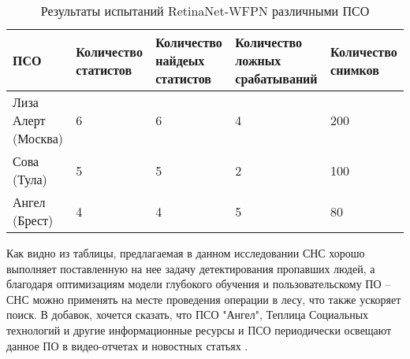 \begin{table}[H]
    \caption{Результаты испытаний RetinaNet-WFPN различными ПСО}\label{usage-results}
    \begin{tabular}{|p{2.8cm}|p{3cm}|p{3cm}|p{3cm}|p{3cm}|}
        \hline
        {ПСО} & {Количество статистов} & {Количество найдеых статистов} & {Количество ложных срабатываний} & {Количество снимков} \\
        \hline
        Лиза Алерт (Москва) & 6 & 6 & 4 & 200 \\
        \hline
        Сова (Тула) & 5 & 5 & 2 & 100 \\
        \hline
        Ангел (Брест) & 4 & 4 & 5 & 80 \\
        \hline
    \end{tabular}
\end{table}

Как видно из таблицы, предлагаемая в данном исследовании СНС хорошо выполняет поставленную на нее задачу детектирования пропавших людей, а благодаря оптимизациям модели глубокого обучения и пользовательскому ПО -- СНС можно применять на месте проведения операции в лесу, что также ускоряет поиск. В добавок, хочется сказать, что ПСО "Ангел", Теплица Социальных технологий и другие информационные ресурсы и ПСО периодически освещают данное ПО в видео-отчетах \cite{lib-lacmus-pr1} \cite{lib-lacmus-pr2} и новостных статьях \cite{lib-lacmus-pr3} \cite{lib-lacmus-pr4} \cite{lib-lacmus-pr5}.

\clearpage